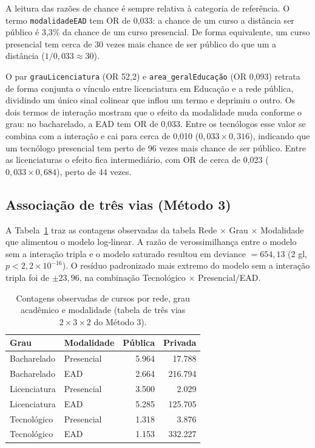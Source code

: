 \documentclass[12pt]{article}
\begin{document}
A leitura das razões de chance é sempre relativa à categoria de referência. O termo \texttt{modalidadeEAD} tem OR de 0,033: a chance de um curso a distância ser público é 3,3\% da chance de um curso presencial. De forma equivalente, um curso presencial tem cerca de 30 vezes mais chance de ser público do que um a distância ($1/0{,}033 \approx 30$).

O par \texttt{grauLicenciatura} (OR 52,2) e \texttt{area\_geralEducação} (OR 0,093) retrata de forma conjunta o vínculo entre licenciatura em Educação e a rede pública, dividindo um único sinal colinear que inflou um termo e deprimiu o outro. Os dois termos de interação mostram que o efeito da modalidade muda conforme o grau: no bacharelado, a EAD tem OR de 0,033. Entre os tecnólogos esse valor se combina com a interação e cai para cerca de 0,010 ($0{,}033 \times 0{,}316$), indicando que um tecnólogo presencial tem perto de 96 vezes mais chance de ser público. Entre as licenciaturas o efeito fica intermediário, com OR de cerca de 0,023 ($0{,}033 \times 0{,}684$), perto de 44 vezes.

\subsection{Associação de três vias (Método 3)}
A Tabela~\ref{tab:loglin} traz as contagens observadas da tabela Rede $\times$ Grau $\times$ Modalidade que alimentou o modelo log-linear. A razão de verossimilhança entre o modelo sem a interação tripla e o modelo saturado resultou em deviance $=654{,}13$ (2 gl, $p<2{,}2\times10^{-16}$). O resíduo padronizado mais extremo do modelo sem a interação tripla foi de $\pm23{,}96$, na combinação Tecnológico $\times$ Presencial/EAD.

\begin{table}[h]
\centering
\small
\begin{tabular}{llrr}
\toprule
Grau & Modalidade & Pública & Privada \\
\midrule
Bacharelado  & Presencial & 5.964 & 17.788 \\
Bacharelado  & EAD        & 2.664 & 216.794 \\
Licenciatura & Presencial & 3.500 & 2.029 \\
Licenciatura & EAD        & 5.285 & 125.705 \\
Tecnológico  & Presencial & 1.318 & 3.876 \\
Tecnológico  & EAD        & 1.153 & 332.227 \\
\bottomrule
\end{tabular}
\caption{Contagens observadas de cursos por rede, grau acadêmico e modalidade (tabela de três vias $2\times3\times2$ do Método 3).}
\label{tab:loglin}
\end{table}
\end{document}

